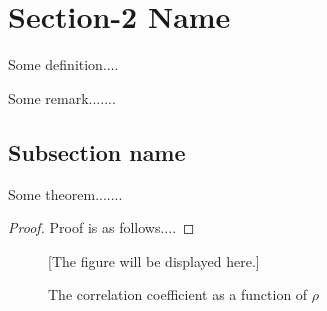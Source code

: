 \section{Section-2 Name}
\begin{definition}\label{abc}
Some definition....
\end{definition}

\begin{remark}
Some remark.......
\end{remark}

\subsection{Subsection name}

\begin{theorem}
Some theorem.......
\end{theorem}

\begin{proof}
Proof is as follows....
\end{proof}


\begin{figure}[h]

[The figure will be displayed here.]

\caption{The correlation coefficient as a function of $\rho$}
\end{figure}
